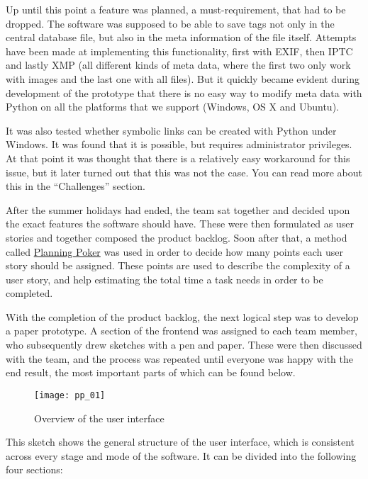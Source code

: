 Up until this point a feature was planned, a must-requirement, that had to be
dropped. The software was supposed to be able to save tags not only in the
central database file, but also in the meta information of the file itself.
Attempts have been made at implementing this functionality, first with EXIF,
then IPTC and lastly XMP (all different kinds of meta data, where the first two
only work with images and the last one with all files). But it quickly became
evident during development of the prototype that there is no easy way to modify
meta data with Python on all the platforms that we support (Windows, OS X and
Ubuntu).

It was also tested whether symbolic links can be created with Python under
Windows. It was found that it is possible, but requires administrator
privileges. At that point it was thought that there is a relatively easy
workaround for this issue, but it later turned out that this was not the case.
You can read more about this in the ``Challenges'' section. %

After the summer holidays had ended, the team sat together and decided upon the
exact features the software should have. These were then formulated as user
stories and together composed the product backlog. Soon after that, a method
called \href{https://en.wikipedia.org/wiki/Planning_poker}{Planning Poker} was
used in order to decide how many points each user story should be assigned.
These points are used to describe the complexity of a user story, and help
estimating the total time a task needs in order to be completed.

With the completion of the product backlog, the next logical step was to
develop a paper prototype. A section of the frontend was assigned to each team
member, who subsequently drew sketches with a pen and paper. These were then
discussed with the team, and the process was repeated until everyone was happy
with the end result, the most important parts of which can be found below.

\begin{figure}
	\centering
	\texttt{[image: pp\_01]}
	\caption{Overview of the user interface}
\end{figure}

This sketch shows the general structure of the user interface, which is
consistent across every stage and mode of the software. It can be divided into
the following four sections:

